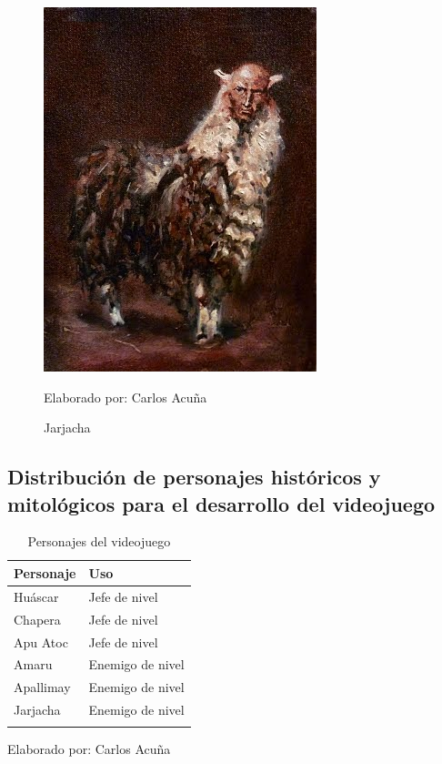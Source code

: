 \documentclass[a4paper, openright, 12pt]{report}
\begin{document}
\begin{figure}[h]
\captionsetup{justification=centering,margin=2cm}
\includegraphics[scale=0.4]{h13}
\centering
\caption{Jarjacha}
Elaborado por: Carlos Acuña
\label{fig:h13}
\end{figure}

\clearpage
\subsection*{Distribución de personajes históricos y mitológicos para el desarrollo del videojuego}

\begin{longtable}{| p{4cm} | p{6cm} |}
\hline
\captionsetup{justification=centering,margin=2cm}
\textbf{Personaje} & \textbf{Uso}\\ \hline
Huáscar & Jefe de nivel \\ \hline
Chapera & Jefe de nivel \\ \hline
Apu Atoc & Jefe de nivel \\ \hline
Amaru & Enemigo de nivel \\ \hline
Apallimay & Enemigo de nivel \\ \hline
Jarjacha & Enemigo de nivel \\ \hline
\caption{Personajes del videojuego}
\label{t:elementosJuego}
\end{longtable}
\begin{center}
Elaborado por: Carlos Acuña
\end{center}
\end{document}
